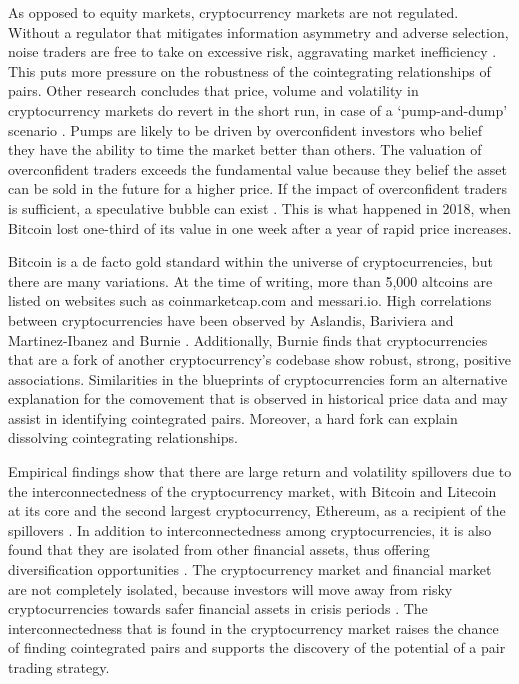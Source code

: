 \documentclass[12pt,english,authoryear]{article}
\begin{document}
As opposed to equity markets, cryptocurrency markets are not regulated. Without a regulator that mitigates information asymmetry and adverse selection, noise traders are free to take on excessive risk, aggravating market inefficiency \cite{Delong_1990}. This puts more pressure on the robustness of the cointegrating relationships of pairs. Other research concludes that price, volume and volatility in cryptocurrency markets do revert in the short run, in case of a ‘pump-and-dump’ scenario \cite{Li_2019}. Pumps are likely to be driven by overconfident investors who belief they have the ability to time the market better than others. The valuation of overconfident traders exceeds the fundamental value because they belief the asset can be sold in the future for a higher price. If the impact of overconfident traders is sufficient, a speculative bubble can exist \cite{Scheikman_2003}. This is what happened in 2018, when Bitcoin lost one-third of its value in one week after a year of rapid price increases. 

Bitcoin is a de facto gold standard within the universe of cryptocurrencies, but there are many variations. At the time of writing, more than 5,000 altcoins are listed on websites such as coinmarketcap.com and messari.io. High correlations between cryptocurrencies have been observed by Aslandis, Bariviera and Martinez-Ibanez \citeyear{Aslanidis_2019} and Burnie \citeyear{Burnie_2018}. Additionally, Burnie finds that cryptocurrencies that are a fork of another cryptocurrency’s codebase show robust, strong, positive associations. Similarities in the blueprints of cryptocurrencies form an alternative explanation for the comovement that is observed in historical price data and may assist in identifying cointegrated pairs. Moreover, a hard fork can explain dissolving cointegrating relationships. 

Empirical findings show that there are large return and volatility spillovers due to the interconnectedness of the cryptocurrency market, with Bitcoin and Litecoin at its core and the second largest cryptocurrency, Ethereum, as a recipient of the spillovers \cite{Ji_2019}. In addition to interconnectedness among cryptocurrencies, it is also found that they are isolated from other financial assets, thus offering diversification opportunities \cite{Corbet_2018}. The cryptocurrency market and financial market are not completely isolated, because investors will move away from risky cryptocurrencies towards safer financial assets in crisis periods \cite{Matkovskyy_2019}. The interconnectedness that is found in the cryptocurrency market raises the chance of finding cointegrated pairs and supports the discovery of the potential of a pair trading strategy.
\end{document}
